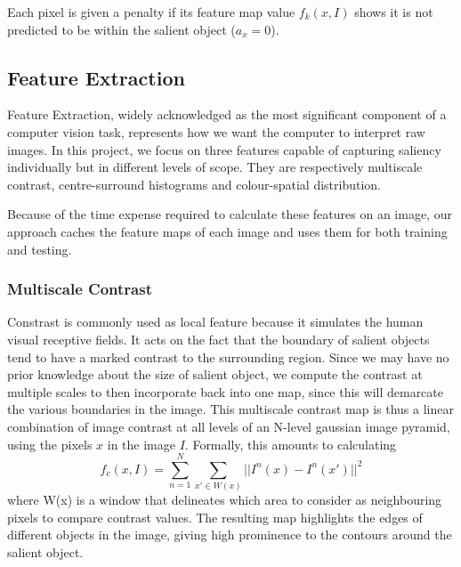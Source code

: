 \documentclass[10pt,twocolumn,letterpaper]{article}
\newcommand{\SUM}{\sum\limits}
\newcommand{\BOLD}{\textbf}
\begin{document}
Each pixel is given a penalty if its feature map value $f_k(x,I)$ shows it is not predicted to be within the salient object ($a_x = 0$).


\subsection{Feature Extraction}
Feature Extraction, widely acknowledged as the most significant component of a computer vision task, represents how we want the computer to interpret raw images. In this project, we focus on three features capable of capturing saliency individually but in different levels of scope. They are respectively multiscale contrast, centre-surround histograms  and colour-spatial distribution.

Because of the time expense required to calculate these features on an image, our approach caches the feature maps of each image and uses them for both training and testing.
\subsubsection{Multiscale Contrast}

Constrast is commonly used as local feature because it simulates the human visual receptive fields. It acts on the fact that the boundary of salient objects tend to have a marked contrast to the surrounding region. Since we may have no prior knowledge about the size of salient object, we compute the contrast at multiple scales to then incorporate back into one map, since this will demarcate the various boundaries in the image.  This multiscale contrast map is thus a linear combination of image contrast at all levels of an N-level gaussian image pyramid, using the pixels $x$ in the image $I$.  Formally, this amounts to calculating $$f_c(x,I) = \SUM_{n = 1}^{N}\SUM_{x'\in W(x)}||I^n(x)-I^n(x')||^2$$ where W(x) is a window that delineates which area to consider as neighbouring pixels to compare contrast values.  The resulting map highlights the edges of different objects in the image, giving high prominence to the contours around the salient object.

\end{document}
